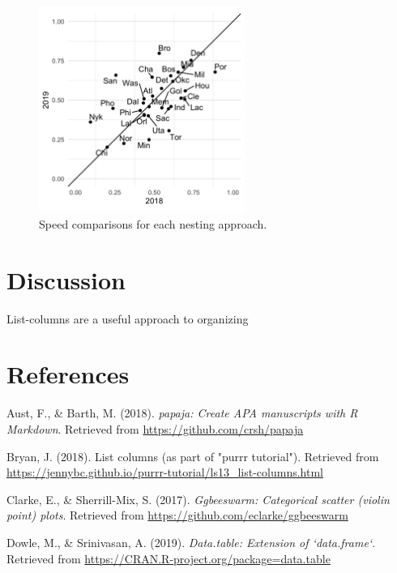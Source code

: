 \documentclass[doc]{apa6}
\begin{document}
\begin{figure}[htb]
  \centering
  \includegraphics[width=0.6\textwidth]{ex_fig.png}
  \caption{Speed comparisons for each nesting approach.}
  \label{speed}
\end{figure}

\hypertarget{discussion}{%
\section{Discussion}\label{discussion}}

List-columns are a useful approach to organizing

\hypertarget{references}{%
\section{References}\label{references}}

\begingroup
\setlength{\parindent}{-0.5in}
\setlength{\leftskip}{0.5in}

\hypertarget{refs}{}
\leavevmode\hypertarget{ref-R-papaja}{}%
Aust, F., \& Barth, M. (2018). \emph{papaja: Create APA manuscripts with R Markdown}. Retrieved from \url{https://github.com/crsh/papaja}

\leavevmode\hypertarget{ref-jenny}{}%
Bryan, J. (2018). List columns (as part of "purrr tutorial"). Retrieved from \url{https://jennybc.github.io/purrr-tutorial/ls13_list-columns.html}

\leavevmode\hypertarget{ref-R-ggbeeswarm}{}%
Clarke, E., \& Sherrill-Mix, S. (2017). \emph{Ggbeeswarm: Categorical scatter (violin point) plots}. Retrieved from \url{https://github.com/eclarke/ggbeeswarm}

\leavevmode\hypertarget{ref-R-data.table}{}%
Dowle, M., \& Srinivasan, A. (2019). \emph{Data.table: Extension of `data.frame`}. Retrieved from \url{https://CRAN.R-project.org/package=data.table}
\end{document}
